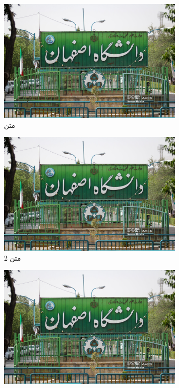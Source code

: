 \begin{figure}[htp]
	\centering
	\begin{subfigure}[b]{0.3\textwidth}
		\centering
		\includegraphics[width=\textwidth]{./Content/Chapter2/Chart/../Figure/uni ui.jpg}
		\caption{متن}
		\label{fig:fig1-1}
	\end{subfigure}
	\hfill
	\begin{subfigure}[b]{0.3\textwidth}
		\centering
		\includegraphics[width=\textwidth]{./Content/Chapter2/Figure/uni ui.jpg}
		\caption{متن 2}
		\label{fig:fig1-2}
	\end{subfigure}
	\hfill
	\begin{subfigure}[b]{0.3\textwidth}
		\centering
		\includegraphics[width=\textwidth]{./Content/Chapter2/Figure/uni ui.jpg}

\end{subfigure}
\end{figure}
